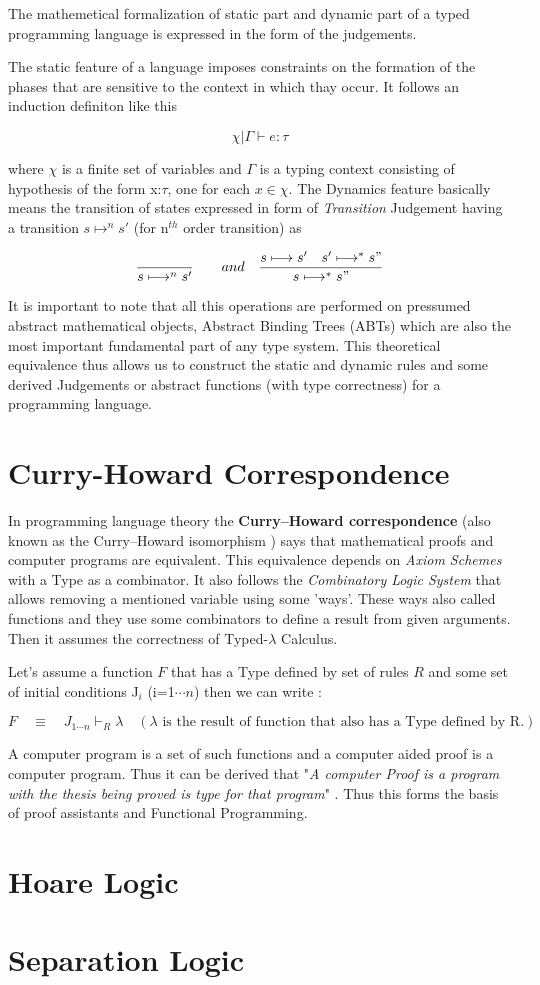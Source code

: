 The mathemetical formalization of static part and dynamic part of a typed programming language is expressed in the form of the judgements.

The static feature of a language imposes constraints on the formation of the phases that are sensitive to the context in which thay occur. It follows an induction definiton like this

\[\chi | \Gamma\vdash e:\tau\]

where $\chi$ is a finite set of variables and $\Gamma$ is a typing context consisting of hypothesis of the form x:$\tau$, one for each $x\in\chi$. The Dynamics feature basically means the transition of states expressed in form of \textit{Transition} Judgement having a transition $s\longmapsto^n s'$ (for n$^{th}$ order transition) as

\[\dfrac{}{s\longmapsto^n s'} \quad \quad and \quad \dfrac{{s\longmapsto s'} \quad {s'\longmapsto^{*} s"}}{s\longmapsto^{*} s"}  \]

It is important to note that all this operations are performed on pressumed abstract mathematical objects, Abstract Binding Trees (ABTs) which are also the most important fundamental part of any type system. This theoretical equivalence thus allows us to construct the static and dynamic rules and some derived Judgements or abstract functions (with type correctness) for a programming language.

\section{Curry-Howard Correspondence}
In programming language theory the \textbf{Curry–Howard correspondence} (also known as the Curry–Howard isomorphism ) says that mathematical proofs and computer programs are equivalent. This equivalence depends on \textit{Axiom Schemes} with a Type as a combinator. It also follows the \textit{Combinatory Logic System} that allows removing a mentioned variable using some 'ways'. These ways also called functions and they use some combinators to define a result from given arguments. Then it assumes the correctness of Typed-$\lambda$ Calculus. 

Let's assume a function $F$ that has a Type defined by set of rules $R$ and some set of initial conditions J$_i$ (i=1$\cdots n$) then we can write :

\[F \quad \equiv \quad J_{1 \cdots n}\vdash_R \lambda \quad (\lambda \mbox{ is the result of function that also has a Type defined by R.}) \]

A computer program is a set of such functions and a computer aided proof is a computer program. Thus it can be derived that "\textit{A computer Proof is a program with the thesis being proved is type for that program}" . Thus this forms the basis of proof assistants and Functional Programming. 

\section{Hoare Logic}

\section{Separation Logic}
